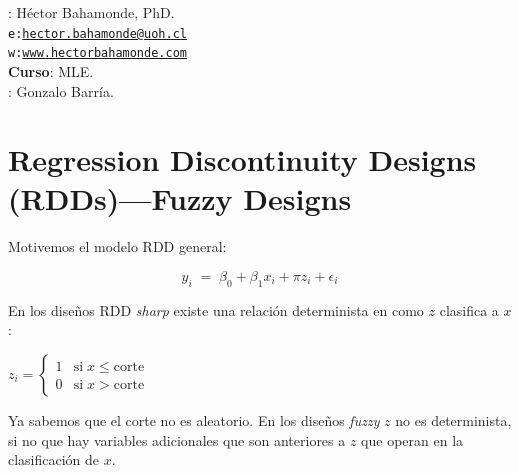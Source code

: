\documentclass[onesided]{article}\usepackage[]{graphicx}\usepackage[]{color}
\begin{document}











\hspace{-5mm}{\bf Profesor}: H\'ector Bahamonde, PhD.\\
\texttt{e:}\href{mailto:hector.bahamonde@uoh.cl}{\texttt{hector.bahamonde@uoh.cl}}\\
\texttt{w:}\href{http://www.hectorbahamonde.com}{\texttt{www.hectorbahamonde.com}}\\
{\bf Curso}: MLE.\\
\hspace{-5mm}{\bf TA}: Gonzalo Barr\'ia.


\section*{Regression Discontinuity Designs (RDDs)---Fuzzy Designs}

Motivemos el modelo RDD general:

\begin{equation}\label{eq:1}
y_{i} \;=\; \beta_{0} + \beta_{1}x_{i} + \pi z_{i} + \epsilon_{i}
\end{equation}

En los dise\~nos RDD \emph{sharp} existe una relaci\'on determinista en como $z$ clasifica a $x$ \parencite[202]{Hahn2001a}:


\begin{center}
$z_{i} = \left \{ 
\begin{matrix}\label{det:1}
     1 & \text{si} \; x \le \text{corte} \\
     0 & \text{si} \; x > \text{corte}

\end{matrix}\right. $
\end{center}

Ya sabemos que el corte no es aleatorio. En los dise\~nos \emph{fuzzy} $z$ no es determinista, si no que hay variables adicionales que son anteriores a $z$ que operan en la clasificaci\'on de $x$. 
\end{document}
